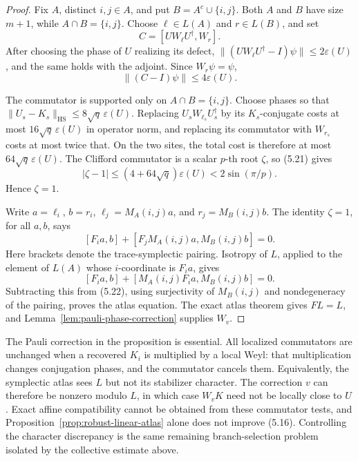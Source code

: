 \begin{proof}
Fix \(A\), distinct \(i,j\in A\), and put
\(B=A^c\cup\{i,j\}\).  Both \(A\) and \(B\) have size \(m+1\), while
\(A\cap B=\{i,j\}\).  Choose \(\ell\in L(A)\) and \(r\in L(B)\), and set
\[
 C=[UW_\ell U^\dagger,W_r].
\]
After choosing the phase of \(U\) realizing its defect,
\(\lVert(UW_\ell U^\dagger-I)\psi\rVert\leq2\varepsilon(U)\), and the
same holds with the adjoint.  Since \(W_r\psi=\psi\),
\[
 \lVert(C-I)\psi\rVert\leq4\varepsilon(U).             \tag{5.21}
\]

The commutator is supported only on \(A\cap B=\{i,j\}\).
Choose phases so that
\(\lVert U_s-K_s\rVert_{\mathrm{HS}}\leq8\sqrt q\,\varepsilon(U)\).
Replacing \(U_sW_{\ell_s}U_s^\dagger\) by its \(K_s\)-conjugate costs at
most \(16\sqrt q\,\varepsilon(U)\) in operator norm, and replacing its
commutator with \(W_{r_s}\) costs at most twice that.  On the two sites,
the total cost is therefore at most
\(64\sqrt q\,\varepsilon(U)\).  The Clifford commutator is a scalar
\(p\)-th root \(\zeta\), so (5.21) gives
\[
 |\zeta-1|\leq(4+64\sqrt q)\varepsilon(U)<2\sin(\pi/p).
\]
Hence \(\zeta=1\).

Write \(a=\ell_i\), \(b=r_i\),
\(\ell_j=M_A(i,j)a\), and \(r_j=M_B(i,j)b\).
The identity \(\zeta=1\), for all \(a,b\), says
\[
 [F_i a,b]+[F_jM_A(i,j)a,M_B(i,j)b]=0.                \tag{5.22}
\]
Here brackets denote the trace-symplectic pairing.  Isotropy of \(L\),
applied to the element of \(L(A)\) whose \(i\)-coordinate is \(F_i a\),
gives
\[
 [F_i a,b]+[M_A(i,j)F_i a,M_B(i,j)b]=0.
\]
Subtracting this from (5.22), using surjectivity of \(M_B(i,j)\) and
nondegeneracy of the pairing, proves the atlas equation.
The exact atlas theorem gives \(FL=L\), and
Lemma~\ref{lem:pauli-phase-correction} supplies \(W_v\).
\end{proof}

The Pauli correction in the proposition is essential.  All localized
commutators are unchanged when a recovered \(K_i\) is multiplied by a
local Weyl: that multiplication changes conjugation phases, and the
commutator cancels them.  Equivalently, the symplectic atlas sees \(L\)
but not its stabilizer character.  The correction \(v\) can therefore be
nonzero modulo \(L\), in which case \(W_vK\) need not be locally close to
\(U\).  Exact affine compatibility cannot be obtained from these
commutator tests, and Proposition~\ref{prop:robust-linear-atlas} alone
does not improve (5.16).  Controlling the character discrepancy is the
same remaining branch-selection problem isolated by the collective
estimate above.

